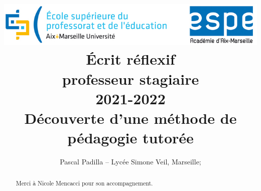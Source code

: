 \documentclass[a4paper, 12pt]{article}
\title{{\includegraphics[width=\linewidth]{espe}}\\[2cm]
Écrit réflexif\\professeur stagiaire\\2021-2022 \\[4cm]
\textbf{Découverte d'une méthode de pédagogie tutorée}\\[2cm]
}
\author{Pascal Padilla -- Lyc\'ee Simone Veil, Marseille; \email{pascal.padilla@ax-aix-marseille.fr}}
\date{}
\begin{document}
\renewcommand{\labelitemi}{\textbullet}

\maketitle

\thispagestyle{empty}

\newpage
\begin{abstract}

Merci à Nicole Mencacci pour son accompagnement.

\end{abstract}

\thispagestyle{empty}

\newpage
\tableofcontents

\thispagestyle{empty}

\newpage
%
%










% 

% 

% 

\end{document}
